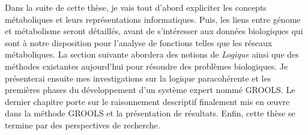 \begin{refsegment}

Dans la suite de cette thèse, je vais tout d’abord expliciter les concepts métaboliques et leurs représentations informatiques. Puis, les liens entre génome et métabolisme seront détaillés, avant de s'intéresser aux données biologiques qui sont à notre disposition pour l’analyse de fonctions telles que les réseaux métaboliques. La section suivante abordera des notions de \textit{Logique} ainsi que des méthodes existantes aujourd'hui pour résoudre des problèmes biologiques. Je présenterai ensuite mes investigations sur la logique paracohérente et les premières phases du développement d'un système expert nommé \gls{GROOLS}. Le dernier chapitre porte sur le raisonnement descriptif finalement mis en œuvre dans la méthode \gls{GROOLS} et la présentation de résultats. Enfin, cette thèse se termine par des perspectives de recherche.



\end{refsegment}
